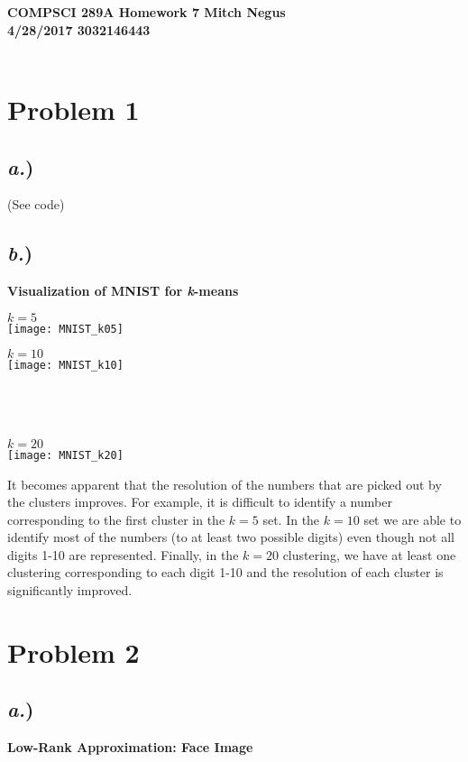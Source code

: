 \documentclass{report}
\begin{document}
\thispagestyle{empty}

{\bf {\large {COMPSCI 289A} Homework {7} \hfill Mitch Negus\\
		4/28/2017 						\hfill	3032146443}}\\\\


\section*{Problem 1}

\subsection*{\textit{a.})}

(See code)


\subsection*{\textit{b.})}
\textbf{Visualization of MNIST for \textit{k}-means}

$k = 5$\\
\texttt{[image: MNIST\_k05]}

$k = 10$\\
\texttt{[image: MNIST\_k10]}

\-\\
\-\\
\-\\
$k = 20$\\
\texttt{[image: MNIST\_k20]}


It becomes apparent that the resolution of the numbers that are picked out by the clusters improves. For example, it is difficult to identify a number corresponding to the first cluster in the $k=5$ set. In the $k=10$ set we are able to identify most of the numbers (to at least two possible digits) even though not all digits 1-10 are represented. Finally, in the $k=20$ clustering, we have at least one clustering corresponding to each digit 1-10 and the resolution of each cluster is significantly improved.


\newpage
\section*{Problem 2}

\subsection*{\textit{a.})}
\textbf{Low-Rank Approximation: Face Image}
\end{document}
